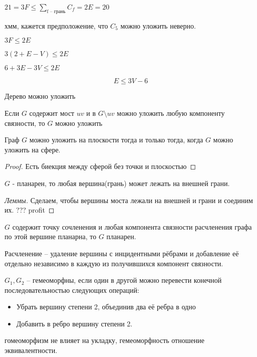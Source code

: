 \documentclass{book}
\theoremstyle{definition}
\begin{document}
$21 = 3F\leqslant \sum\limits_{\text{f -- грань}}C_f = 2E = 20$ 

хмм, кажется предположение, что $C_5$ можно уложить неверно.

$3F\leqslant 2E$

$3\left( 2 + E - V \right) \leqslant 2E$

$6 + 3E - 3V \leqslant  2E$

\begin{statement}
\[E\leqslant  3V-6\]
\end{statement}

\begin{lemma}
    Дерево можно уложить
\end{lemma}

\begin{lemma}
    Если $G$ содержит мост  $uv$ и  в $G\setminus uv$ можно уложить любую компоненту связности, то $G$ можно уложить
\end{lemma}

\begin{theorem}
    Граф $G$ можно уложить на плоскости тогда и только тогда, когда  $G$ можно уложить на сфере.
\end{theorem}
\begin{proof}
    Есть биекция между сферой без точки и плоскостью
\end{proof}

\begin{corollary}
    $G$ - планарен, то любая вершина(грань) может лежать на внешней грани.
\end{corollary}

\begin{proof}
    [Леммы]

    Сделаем, чтобы вершины моста лежали на внешней и грани и соединим их. ??? profit
\end{proof}

\begin{lemma}
    $G$ содержит точку сочленения и любая компонента связности расчленения графа по этой вершине планарна, то  $G$ планарен.

    Расчленение -- удаление вершины с инцидентными рёбрами и добавление её отдельно независимо в каждую из получившихся компонент связности.
\end{lemma}

\begin{definition}
    $G_1, G_2$ -- гемеоморфны, если один в другой можно перевести конечной последовательностью следующих операций:
    \begin{itemize}
        \item Убрать вершину степени 2,  объединив два её ребра в одно
        \item Добавить в ребро вершину степени 2.
    \end{itemize}

    гомеоморфизм не влияет на укладку, гемеоморфность отношение эквивалентности.
\end{definition}
\end{document}
